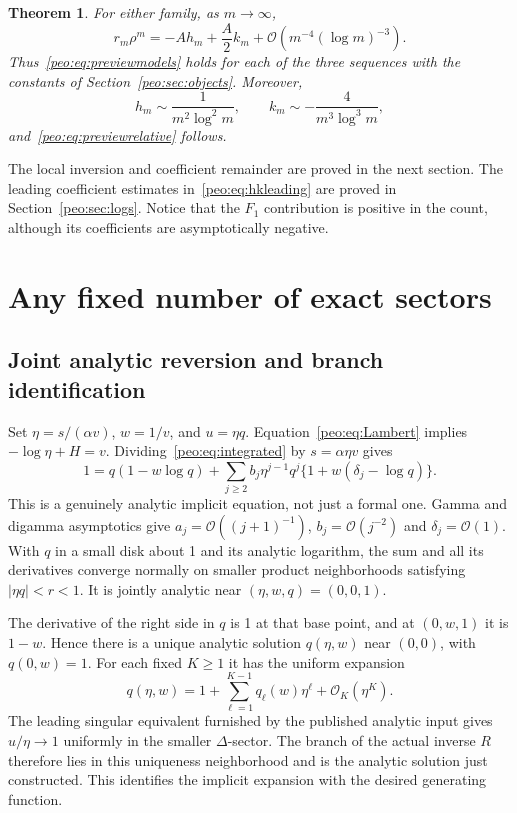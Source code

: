 \documentclass[11pt]{article}
\numberwithin{equation}{section}
\newtheorem{theorem}{Theorem}[section]
\theoremstyle{remark}\newtheorem{remark}[theorem]{Remark}
\newcommand{\Oh}{\mathcal O}
\begin{document}
\begin{theorem}\label{peo:thm:two}
For either family, as $m\to\infty$,
\begin{equation}
 r_m\rho^m=-Ah_m+\frac A2 k_m+\Oh(m^{-4}(\log m)^{-3}).
 \label{peo:eq:twosectors}
\end{equation}
Thus~\eqref{peo:eq:previewmodels} holds for each of the three sequences with the constants of Section~\ref{peo:sec:objects}. Moreover,
\begin{equation}
 h_m\sim\frac1{m^2\log^2m},\qquad
 k_m\sim-\frac4{m^3\log^3m},\label{peo:eq:hkleading}
\end{equation}
and~\eqref{peo:eq:previewrelative} follows.
\end{theorem}
The local inversion and coefficient remainder are proved in the next section. The leading coefficient estimates in~\eqref{peo:eq:hkleading} are proved in Section~\ref{peo:sec:logs}. Notice that the $F_1$ contribution is positive in the count, although its coefficients are asymptotically negative.

\section{Any fixed number of exact sectors}\label{peo:sec:sectors}
\subsection{Joint analytic reversion and branch identification}\label{peo:sec:joint}
Set $\eta=s/(\alpha v)$, $w=1/v$, and $u=\eta q$. Equation~\eqref{peo:eq:Lambert} implies $-\log\eta+H=v$. Dividing~\eqref{peo:eq:integrated} by $s=\alpha\eta v$ gives
\begin{equation}
 1=q(1-w\log q)+\sum_{j\ge2}b_j\eta^{j-1}q^j
 \{1+w(\delta_j-\log q)\}.\label{peo:eq:joint}
\end{equation}
This is a genuinely analytic implicit equation, not just a formal one. Gamma and digamma asymptotics give $a_j=\Oh((j+1)^{-1})$, $b_j=\Oh(j^{-2})$ and $\delta_j=\Oh(1)$. With $q$ in a small disk about 1 and its analytic logarithm, the sum and all its derivatives converge normally on smaller product neighborhoods satisfying $|\eta q|<r<1$. It is jointly analytic near $(\eta,w,q)=(0,0,1)$.

The derivative of the right side in $q$ is 1 at that base point, and at $(0,w,1)$ it is $1-w$. Hence there is a unique analytic solution $q(\eta,w)$ near $(0,0)$, with $q(0,w)=1$. For each fixed $K\ge1$ it has the uniform expansion
\begin{equation}
 q(\eta,w)=1+\sum_{\ell=1}^{K-1}q_\ell(w)\eta^\ell+\Oh_K(\eta^K).
 \label{peo:eq:qseries}
\end{equation}
The leading singular equivalent furnished by the published analytic input gives $u/\eta\to1$ uniformly in the smaller $\Delta$-sector. The branch of the actual inverse $R$ therefore lies in this uniqueness neighborhood and is the analytic solution just constructed. This identifies the implicit expansion with the desired generating function.
\end{document}
